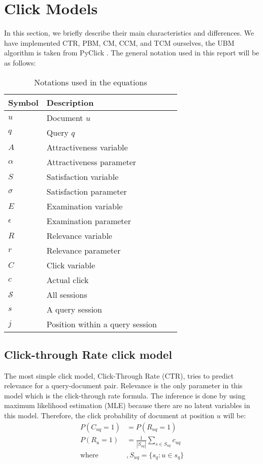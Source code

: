 \section{Click Models}
\label{sec:methodology}
In this section, we briefly describe their main characteristics and differences. We have implemented CTR, PBM, CM, CCM, and TCM ourselves, the UBM algorithm is taken from PyClick \cite{PyClick}. The general notation used in this report will be as follows:

\begin{table}[ht]
	\centering
	\begin{tabular}{l|lll|}
		\hline
		Symbol & Description \\
		\hline
		$u$	& Document $u$ \\
		$q$	& Query $q$ \\
		$ A $ & Attractiveness variable \\
		$ \alpha $ & Attractiveness parameter \\
		$ S $ & Satisfaction variable \\
		$ \sigma $ & Satisfaction parameter \\
		$ E $ & Examination variable \\
		$ \epsilon $ & Examination parameter \\
		$ R $ & Relevance variable \\
		$ r $ & Relevance parameter \\
		$ C $ & Click variable \\
		$ c $ & Actual click \\
		$ \mathcal{S} $ & All sessions \\
		$ s $ & A query session \\
		$ j $ & Position within a query session \\
		\hline
	\end{tabular}
	\caption{Notations used in the equations}
	\label{table:notations}
\end{table}

\subsection{Click-through Rate click model}
The most simple click model, Click-Through Rate (CTR), tries to predict relevance for a query-document pair. Relevance is the only parameter in this model which is the click-through rate formula. The inference is done by using maximum likelihood estimation (MLE) because there are no latent variables in this model. Therefore, the click probability of document at position $u$ will be:
\begin{align}
	P(C_{uq}=1) &= P(R_{uq}=1) \nonumber \\
	P(R_{u}=1) &= \frac{1}{|S_{uq}|} \sum_{s \in S_{uq}} c_{uq} \label{eq:ctr_rel}\\
	\text{where}&, S_{uq} = \{ s_q : u \in s_q \} \nonumber
\end{align}


